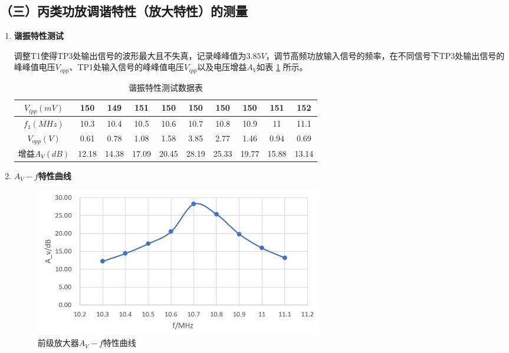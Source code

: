 \documentclass[UTF8]{ctexart}
\begin{document}
\subsection*{（三）丙类功放调谐特性（放大特性）的测量}
\begin{enumerate}
    \item \textbf{谐振特性测试}

    调整T1使得TP3处输出信号的波形最大且不失真，记录峰峰值为$3.85V $，调节高频功放输入信号的频率，在不同信号下TP3处输出信号的峰峰值电压$V_{opp}$、TP1处输入信号的峰峰值电压$V_{ipp}$以及电压增益$A_V$如表 \ref{tab:3.1} 所示。

    \begin{table}[H]
        \centering
        \caption{谐振特性测试数据表}
        \label{tab:3.1}
        \begin{tabular}{c|c|c|c|c|c|c|c|c|c}
        \hline
        $V_{ipp}(mV)$ &  150  &  149 &  151  & 150  & 150  &  150 &150   &  151  & 152  \\ \hline
        $f_1(MHz)$  & 10.3 & 10.4 & 10.5 & 10.6 & 10.7 & 10.8 & 10.9 & 11 & 11.1 \\ \hline
        $V_{opp}(V)$ &  0.61  & 0.78  &  1.08 & 1.58  &  3.85 &  2.77 &  1.46 &0.94 & 0.69 \\ \hline
        增益$A_V(dB)$ & 12.18& 14.38 & 17.09 & 20.45 & 28.19 &  25.33 & 19.77  &15.88& 13.14  \\ \hline
        \end{tabular}
    \end{table}
    \vspace{-2em}
    \item \textbf{$A_V-f$特性曲线}
    \begin{figure}[H]
        \centering
        \includegraphics[width=0.63\textwidth]{pics/AV-F.png}
        \caption{前级放大器$A_V-f$特性曲线}\label{fig:AV-F}
    \end{figure}
\end{enumerate}
\end{document}
